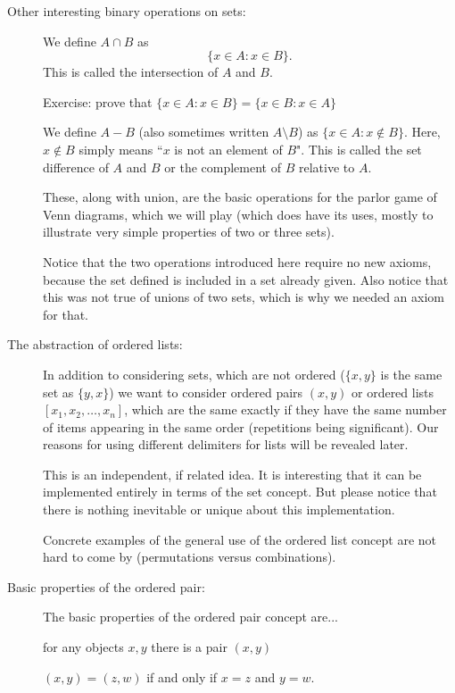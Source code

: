 \documentclass[12pt]{article}
\begin{document}
\begin{description}
\item[Other interesting binary operations on sets:]

We define $A \cap B$ as $$\{x \in A:x \in B\}.$$  This is called the intersection of $A$ and $B$.

Exercise:  prove that $\{x \in A:x \in B\} = \{x \in B:x \in A\}$

We define $A - B$ (also sometimes written $A \setminus B$) as $\{x \in A:x \not\in B\}$.  Here, $x \not\in B$ simply means ``$x$ is not an element of $B$".
This is called the set difference of $A$ and $B$ or the complement of $B$ relative to $A$.

These, along with union, are the basic operations for the parlor game of Venn diagrams, which we will play (which does have its uses, mostly to illustrate very simple properties of two or three sets).

Notice that the two operations introduced here require no new axioms, because the set defined is included in a set already given.  Also notice that this was not true of unions of two sets, which is why we needed an axiom for that.

\item[The abstraction of ordered lists:]

In addition to considering sets, which are not ordered ($\{x,y\}$ is the same set as $\{y,x\}$) we want to consider
ordered pairs $(x,y)$ or ordered lists $[x_1,x_2,\ldots,x_n]$, which are the same exactly if they have the same number of items appearing in the same order (repetitions being significant).  Our reasons for using different delimiters for lists will be revealed later.

This is an independent, if related idea.  It is interesting that it can be implemented entirely in terms of the set concept.  But please notice that there is nothing inevitable or unique about this implementation.

Concrete examples of the general use of the ordered list concept are not hard to come by (permutations versus combinations).

\item[Basic properties of the ordered pair:]

The basic properties of the ordered pair concept are...

for any objects $x,y$ there is a pair $(x,y)$

$(x,y) = (z,w)$ if and only if $x=z$ and $y=w$.


\end{description}
\end{document}
